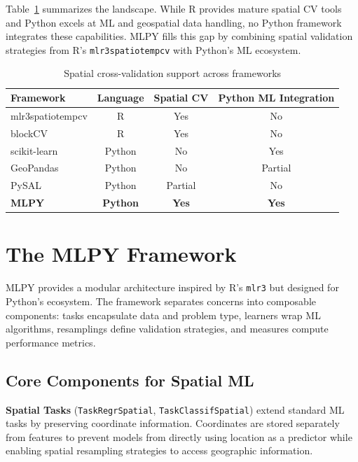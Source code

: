 \documentclass[a4paper,fleqn]{cas-sc}
\begin{document}
Table~\ref{tab:gap} summarizes the landscape. While R provides mature spatial CV tools and Python excels at ML and geospatial data handling, no Python framework integrates these capabilities. MLPY fills this gap by combining spatial validation strategies from R's \texttt{mlr3spatiotempcv} with Python's ML ecosystem.

\begin{table}
\centering
\caption{Spatial cross-validation support across frameworks}
\label{tab:gap}
\begin{tabular}{lccc}
\toprule
Framework & Language & Spatial CV & Python ML Integration \\
\midrule
mlr3spatiotempcv & R & Yes & No \\
blockCV & R & Yes & No \\
scikit-learn & Python & No & Yes \\
GeoPandas & Python & No & Partial \\
PySAL & Python & Partial & No \\
\textbf{MLPY} & \textbf{Python} & \textbf{Yes} & \textbf{Yes} \\
\bottomrule
\end{tabular}
\end{table}


\section{The MLPY Framework}
\label{sec:framework}

MLPY provides a modular architecture inspired by R's \texttt{mlr3} \citep{lang2019mlr3} but designed for Python's ecosystem. The framework separates concerns into composable components: tasks encapsulate data and problem type, learners wrap ML algorithms, resamplings define validation strategies, and measures compute performance metrics.

\subsection{Core Components for Spatial ML}

\textbf{Spatial Tasks} (\texttt{TaskRegrSpatial}, \texttt{TaskClassifSpatial}) extend standard ML tasks by preserving coordinate information. Coordinates are stored separately from features to prevent models from directly using location as a predictor while enabling spatial resampling strategies to access geographic information.
\end{document}
